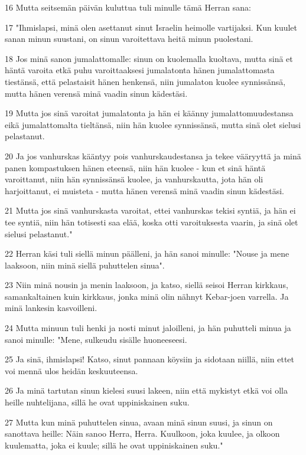 \par 16 Mutta seitsemän päivän kuluttua tuli minulle tämä Herran sana:
\par 17 "Ihmislapsi, minä olen asettanut sinut Israelin heimolle vartijaksi. Kun kuulet sanan minun suustani, on sinun varoitettava heitä minun puolestani.
\par 18 Jos minä sanon jumalattomalle: sinun on kuolemalla kuoltava, mutta sinä et häntä varoita etkä puhu varoittaaksesi jumalatonta hänen jumalattomasta tiestänsä, että pelastaisit hänen henkensä, niin jumalaton kuolee synnissänsä, mutta hänen verensä minä vaadin sinun kädestäsi.
\par 19 Mutta jos sinä varoitat jumalatonta ja hän ei käänny jumalattomuudestansa eikä jumalattomalta tieltänsä, niin hän kuolee synnissänsä, mutta sinä olet sielusi pelastanut.
\par 20 Ja jos vanhurskas kääntyy pois vanhurskaudestansa ja tekee vääryyttä ja minä panen kompastuksen hänen eteensä, niin hän kuolee - kun et sinä häntä varoittanut, niin hän synnissänsä kuolee, ja vanhurskautta, jota hän oli harjoittanut, ei muisteta - mutta hänen verensä minä vaadin sinun kädestäsi.
\par 21 Mutta jos sinä vanhurskasta varoitat, ettei vanhurskas tekisi syntiä, ja hän ei tee syntiä, niin hän totisesti saa elää, koska otti varoituksesta vaarin, ja sinä olet sielusi pelastanut."
\par 22 Herran käsi tuli siellä minun päälleni, ja hän sanoi minulle: "Nouse ja mene laaksoon, niin minä siellä puhuttelen sinua".
\par 23 Niin minä nousin ja menin laaksoon, ja katso, siellä seisoi Herran kirkkaus, samankaltainen kuin kirkkaus, jonka minä olin nähnyt Kebar-joen varrella. Ja minä lankesin kasvoilleni.
\par 24 Mutta minuun tuli henki ja nosti minut jaloilleni, ja hän puhutteli minua ja sanoi minulle: "Mene, sulkeudu sisälle huoneeseesi.
\par 25 Ja sinä, ihmislapsi! Katso, sinut pannaan köysiin ja sidotaan niillä, niin ettet voi mennä ulos heidän keskuuteensa.
\par 26 Ja minä tartutan sinun kielesi suusi lakeen, niin että mykistyt etkä voi olla heille nuhtelijana, sillä he ovat uppiniskainen suku.
\par 27 Mutta kun minä puhuttelen sinua, avaan minä sinun suusi, ja sinun on sanottava heille: Näin sanoo Herra, Herra. Kuulkoon, joka kuulee, ja olkoon kuulematta, joka ei kuule; sillä he ovat uppiniskainen suku."


